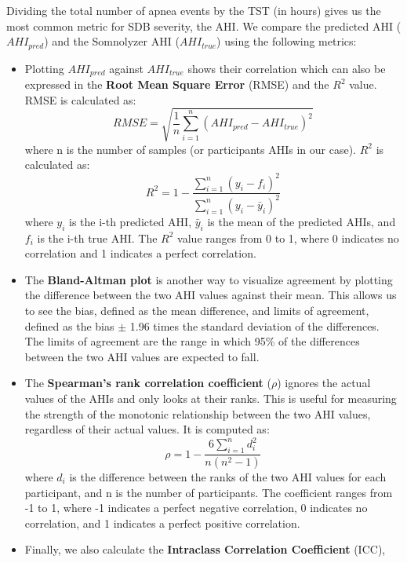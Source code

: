 Dividing the total number of apnea events by the TST (in hours) gives us the most common metric for SDB severity, the AHI. We compare the predicted AHI ($AHI_{pred}$) and the Somnolyzer AHI ($AHI_{true}$) using the following metrics:

\begin{itemize}
    \item Plotting $AHI_{pred}$ against $AHI_{true}$ shows their correlation which can also be expressed in the \textbf{Root Mean Square Error} (RMSE) and the \textbf{$R^2$} value. RMSE is calculated as:
    \begin{equation}
        RMSE = \sqrt{\frac{1}{n}\sum_{i=1}^{n}(AHI_{pred} - AHI_{true})^2} 
    \end{equation}
    where n is the number of samples (or participants AHIs in our case). $R^2$ is calculated as:
    \begin{equation}
        R^2 = 1 - \frac{\sum_{i=1}^{n}(y_i - f_i)^2}{\sum_{i=1}^{n}(y_i - \bar{y}_i)^2}
    \end{equation}
    where $y_i$ is the i-th predicted AHI, $\bar{y}_i$ is the mean of the predicted AHIs, and $f_i$ is the i-th true AHI. The $R^2$ value ranges from 0 to 1, where 0 indicates no correlation and 1 indicates a perfect correlation.
    \item The \textbf{Bland-Altman plot} is another way to visualize agreement by plotting the difference between the two AHI values against their mean. This allows us to see the bias, defined as the mean difference, and limits of agreement, defined as the bias $\pm$ 1.96 times the standard deviation of the differences. The limits of agreement are the range in which 95\% of the differences between the two AHI values are expected to fall.
    \item The \textbf{Spearman's rank correlation coefficient} ($\rho$) ignores the actual values of the AHIs and only looks at their ranks. This is useful for measuring the strength of the monotonic relationship between the two AHI values, regardless of their actual values. It is computed as:
    \begin{equation}
        \rho = 1 - \frac{6\sum_{i=1}^{n}d_i^2}{n(n^2-1)}
    \end{equation}
    where $d_i$ is the difference between the ranks of the two AHI values for each participant, and n is the number of participants.
    The coefficient ranges from -1 to 1, where -1 indicates a perfect negative correlation, 0 indicates no correlation, and 1 indicates a perfect positive correlation.
    \item Finally, we also calculate the \textbf{Intraclass Correlation Coefficient} (ICC), 
\end{itemize}

